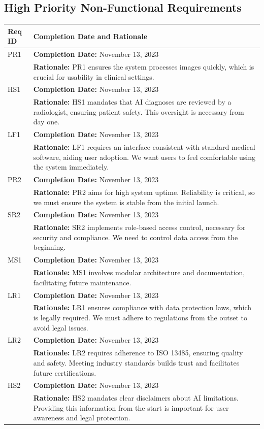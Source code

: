 \documentclass[12pt]{article}
\begin{document}
\subsection{High Priority Non-Functional Requirements}
\begin{table}[H]
  \label{TblHighPriorityNFRs}
  \begin{tabular}{p{}|p{}}
  \toprule
  \textbf{Req ID} & \textbf{Completion Date and Rationale} \\
  \midrule
  PR1 & \textbf{Completion Date:} November 13, 2023\\
      & \textbf{Rationale:} PR1 ensures the system processes images quickly, which is crucial for usability in clinical settings. \\
  \midrule
  HS1 & \textbf{Completion Date:} November 13, 2023\\
      & \textbf{Rationale:} HS1 mandates that AI diagnoses are reviewed by a radiologist, ensuring patient safety. This oversight is necessary from day one. \\
  \midrule
  LF1 & \textbf{Completion Date:} November 13, 2023\\
      & \textbf{Rationale:} LF1 requires an interface consistent with standard medical software, aiding user adoption. We want users to feel comfortable using the system immediately. \\
  \midrule
  PR2 & \textbf{Completion Date:} November 13, 2023\\
      & \textbf{Rationale:} PR2 aims for high system uptime. Reliability is critical, so we must ensure the system is stable from the initial launch. \\
  \midrule
  SR2 & \textbf{Completion Date:} November 13, 2023\\
      & \textbf{Rationale:} SR2 implements role-based access control, necessary for security and compliance. We need to control data access from the beginning. \\
  \midrule
  MS1 & \textbf{Completion Date:} November 13, 2023\\
      & \textbf{Rationale:} MS1 involves modular architecture and documentation, facilitating future maintenance. \\
  \midrule
  LR1 & \textbf{Completion Date:} November 13, 2023\\
      & \textbf{Rationale:} LR1 ensures compliance with data protection laws, which is legally required. We must adhere to regulations from the outset to avoid legal issues. \\
  \midrule
  LR2 & \textbf{Completion Date:} November 13, 2023\\
      & \textbf{Rationale:} LR2 requires adherence to ISO 13485, ensuring quality and safety. Meeting industry standards builds trust and facilitates future certifications. \\
  \midrule
  HS2 & \textbf{Completion Date:} November 13, 2023\\
      & \textbf{Rationale:} HS2 mandates clear disclaimers about AI limitations. Providing this information from the start is important for user awareness and legal protection. \\
  \bottomrule
  \end{tabular}
  \end{table}
\end{document}
